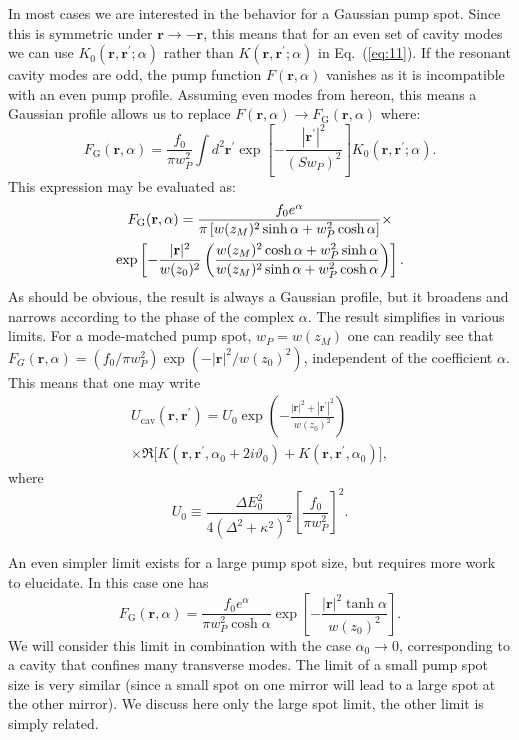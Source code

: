 \documentclass[pra,twocolumn,superscriptaddress]{revtex4-1}
\newcommand{\vect}[1]{\mathbf{#1}}
\newcommand{\pumpwidth}{w_P}
\begin{document}
In most cases we are interested in the behavior for a Gaussian pump
spot.  Since this is symmetric under $\vect{r} \to - \vect{r}$, this
means that for an even set of cavity modes we can use $K_0(\vect r,
\vect r^\prime; \alpha)$ rather than $K(\vect r, \vect r^\prime;
\alpha)$ in Eq.~(\ref{eq:11}).  If the resonant cavity modes are odd,
the pump function $F(\vect r, \alpha)$ vanishes as it is incompatible
with an even pump profile.  Assuming even modes from hereon, this
means a Gaussian profile allows us to replace $F(\vect r,\alpha)\to
F_{\text{G}}(\vect{r},\alpha)$ where:
\begin{displaymath}
  F_{\text{G}}(\vect{r},\alpha)
  =
  \frac{f_0}{\pi \pumpwidth^2}
  \int d^2\vect r^\prime
  \exp\left[- \frac{|\vect r^\prime|^2}{(S \pumpwidth)^2} \right]
  K_0(\vect r,  \vect r^\prime; \alpha).
\end{displaymath}
This expression may be evaluated as:
\begin{multline}
  \label{eq:12}
  F_{\text{G}}(\vect{r},\alpha)
  =
  \frac{f_0 e^\alpha}{\pi \left[
      w(z_M)^2 \sinh \alpha +  \pumpwidth^2 \cosh \alpha\right]}
  \times
  \\
  \exp\left[
    - \frac{|\vect r|^2}{w(z_0)^2}
    \left(
      \frac{%
        w(z_M)^2 \cosh \alpha +  \pumpwidth^2 \sinh\alpha}{%
        w(z_M)^2 \sinh \alpha +  \pumpwidth^2 \cosh\alpha}
    \right)\right].
\end{multline}
As should be obvious, the result is always a Gaussian profile, but it
broadens and narrows according to the phase of the complex $\alpha$.
The result simplifies in various limits.  For a mode-matched pump
spot, $w_P=w(z_M)$ one can readily see that $F_G(\vect r,
\alpha)=(f_0/\pi w_P^2) \exp(-|\vect r|^2/w(z_0)^2)$, independent of
the coefficient $\alpha$.  This means that one may write
\begin{multline}
  \label{eq:17}
  U_{\text{cav}}(\vect r, \vect r^\prime)
  = 
  U_0
  \exp\left( - \frac{|\vect r|^2 + |\vect r^\prime|^2}{w(z_0)^2} \right)
  \\\times\Re\bigl[K(\vect r, \vect r^\prime, \alpha_0+2i\vartheta_0)+
    K(\vect r, \vect r^\prime, \alpha_0)\bigr],
\end{multline}
where
\begin{equation}
  \label{eq:16}
  U_0 \equiv 
  \frac{ \Delta E_0^2}{4 (\Delta^2+\kappa^2)^2} 
  \left[\frac{f_0}{\pi \pumpwidth^2}\right]^2.
\end{equation}

An even simpler limit exists for a large pump spot size, but requires
more work to elucidate.  In this case one has
\begin{equation}
  \label{eq:13}
  F_{\text{G}}(\vect{r},\alpha)
  =
  \frac{f_0 e^\alpha}{\pi \pumpwidth^2 \cosh \alpha}
  \exp\left[ - \frac{|\vect r|^2 \tanh \alpha}{w(z_0)^2}\right].
\end{equation}
We will consider this limit in combination with the case $\alpha_0 \to
0$, corresponding to a cavity that confines many transverse modes.
The limit of a small pump spot size is very similar (since a small
spot on one mirror will lead to a large spot at the other mirror).  We
discuss here only the large spot limit, the other limit is simply
related.
\end{document}
